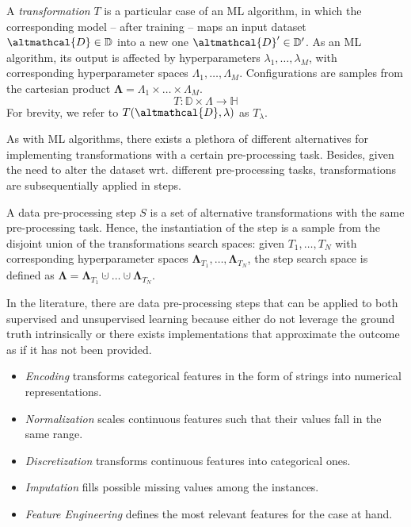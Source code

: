 \begin{definition}
   A \emph{transformation} $T$ is a particular case of an ML algorithm, in which the corresponding model -- after training -- maps an input dataset $\altmathcal{D} \in \mathbb{D}$ into a new one $\altmathcal{D}' \in \mathbb{D}'$.
    As an ML algorithm, its output is affected by hyperparameters $\lambda_1, \dots, \lambda_M$, with corresponding hyperparameter spaces $\Lambda_1, \dots, \Lambda_M$.
    Configurations are samples from the cartesian product $\pmb{\Lambda} = \Lambda_1 \times \ldots \times \Lambda_M$.
    \begin{equation*}
        T: \mathbb{D} \times \Lambda \rightarrow \mathbb{H}
    \end{equation*}
    For brevity, we refer to $T(\altmathcal{D}, \lambda)$ as $T_{\lambda}$.
\end{definition}

As with ML algorithms, there exists a plethora of different alternatives for implementing transformations with a certain pre-processing task.
Besides, given the need to alter the dataset wrt. different pre-processing tasks, transformations are subsequentially applied in steps.

\begin{definition}
    A data pre-processing step $S$ is a set of alternative transformations with the same pre-processing task.
    Hence, the instantiation of the step is a sample from the disjoint union of the transformations search spaces: given $T_1, \dots, T_N$ with corresponding hyperparameter spaces $\pmb{\Lambda}_{T_1}, \dots, \pmb{\Lambda}_{T_N}$, the step search space is defined as  $\pmb{\Lambda}  = \pmb{\Lambda}_{T_1} \cupdot \dots \cupdot \pmb{\Lambda}_{T_N}$.
\end{definition}

In the literature, there are data pre-processing steps that can be applied to both supervised and unsupervised learning because either do not leverage the ground truth intrinsically or there exists implementations that approximate the outcome as if it has not been provided.
\begin{itemize}
    \item \textit{Encoding} transforms categorical features in the form of strings into numerical representations.
    \item \textit{Normalization} scales continuous features such that their values fall in the same range.
    \item \textit{Discretization} transforms continuous features into categorical ones.
    \item \textit{Imputation} fills possible missing values among the instances.
    \item \textit{Feature Engineering} defines the most relevant features for the case at hand.
\end{itemize}

